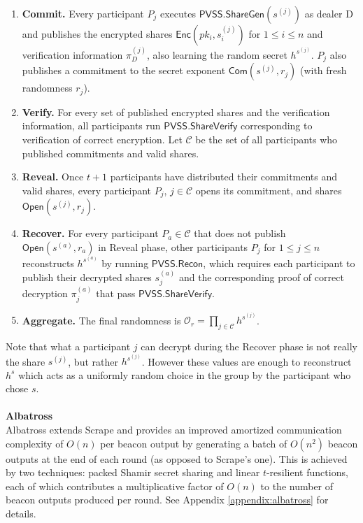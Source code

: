 \documentclass[letterpaper,twocolumn,10pt]{article}
\theoremstyle{definition}
\theoremstyle{remark}
\begin{document}
\begin{enumerate}
\item \textbf{Commit.} Every participant $P_j$ executes $\mathsf{PVSS.ShareGen}(s^{(j)})$ as dealer D and publishes the encrypted shares $\mathsf{Enc}(pk_i, s^{(j)}_i)$ for $1 \le i \le n$ and verification information $\pi_D^{(j)}$, also learning the random secret $h^{s^{(j)}}$. $P_j$ also publishes a commitment to the secret exponent $\mathsf{Com}(s^{(j)}, r_j)$ (with fresh randomness $r_j$).
\item \textbf{Verify.} For every set of published encrypted shares and the verification information, all participants run $\mathsf{PVSS.ShareVerify}$ corresponding to verification of correct encryption. Let $\mathcal{C}$ be the set of all participants who published commitments and valid shares.
\item \textbf{Reveal.} Once $t + 1$ participants have distributed their commitments and valid shares, every participant $P_j$, $j \in \mathcal{C}$ opens its commitment, and shares $\mathsf{Open}(s^{(j)}, r_j)$.
\item \textbf{Recover.} For every participant $P_a \in \mathcal{C}$ that does not publish $\mathsf{Open}(s^{(a)}, r_a)$ in Reveal phase, other participants $P_j$ for $1 \leq j \leq n$ reconstructs $h^{s^{(a)}}$ by running $\mathsf{PVSS.Recon}$, which requires each participant to publish their decrypted shares $s_j^{(a)}$ and the corresponding proof of correct decryption $\pi_j^{(a)}$ that pass $\mathsf{PVSS.ShareVerify}$.
\item \textbf{Aggregate.} The final randomness is $\mathcal{O}_r = \prod_{j \in \mathcal{C}} h^{s^{(j)}}$.
\end{enumerate}

Note that what a participant $j$ can decrypt during the Recover phase is not really the share $s^{(j)}$, but rather $h^{s^{(j)}}$. However these values are enough to reconstruct $h^s$ which acts as a uniformly random choice in the group by the participant who chose $s$. \\\\
\textbf{Albatross}\\
Albatross \cite{cascudo2020albatross} extends Scrape and provides an improved amortized communication complexity of $O(n)$ per beacon output by generating a batch of $O(n^2)$ beacon outputs at the end of each round (as opposed to Scrape's one). This is achieved by two techniques: packed Shamir secret sharing and linear $t$-resilient functions, each of which contributes a multiplicative factor of $O(n)$ to the number of beacon outputs produced per round. See Appendix \ref{appendix:albatross} for details.
\end{document}

